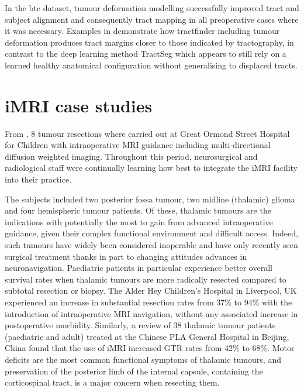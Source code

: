 In the \gls{btc} dataset, tumour deformation modelling successfully improved tract and subject alignment and consequently tract mapping in all preoperative cases where it was necessary.
Examples in  demonstrate how tractfinder including tumour deformation produces tract margins closer to those indicated by tractography, in contrast to the deep learning method TractSeg which appears to still rely on a learned healthy anatomical configuration without generalising to displaced tracts.

\clearpage
\section{iMRI case studies}

From , 8  tumour resections where carried out at Great Ormond Street Hospital for Children with intraoperative MRI guidance including multi-directional diffusion weighted imaging.
Throughout this period, neurosurgical and radiological staff were continually learning how best to integrate the iMRI facility into their practice.

The subjects included two posterior fossa tumour, two midline (thalamic) glioma and four hemispheric tumour patients.
Of these, thalamic tumours are the indications with potentially the most to gain from advanced intraoperative guidance, given their complex functional environment and difficult access.
Indeed, such tumours have widely been considered inoperable and have only recently seen surgical treatment thanks in part to changing attitudes\autocite{Souweidane1996,Puget2007} advances in neuronavigation.\autocite{Sunderland2021}
Paediatric patients in particular\autocite{Ferroli2023} experience better overall survival rates when thalamic tumours are more radically resected compared to subtotal resection or biopsy.\autocite{Cinalli2018a}
The Alder Hey Children's Hospital in Liverpool, UK experienced an increase in substantial resection  rates from 37\% to 94\% with the introduction of intraoperative MRI navigation, without any associated increase in postoperative morbidity.\autocite{Sunderland2021}
Similarly, a review of 38 thalamic tumour patients (paediatric and adult) treated at the Chinese PLA General Hospital in Beijing, China found that the use of iMRI increased GTR rates from 42\% to 68\%.\autocite{Zheng2016}
Motor deficits are the most common functional symptoms of thalamic tumours,\autocite{Puget2007, Zheng2016, Palmisciano2021} and preservation of the posterior limb of the internal capsule, containing the corticospinal tract, is a major concern when resecting them.

